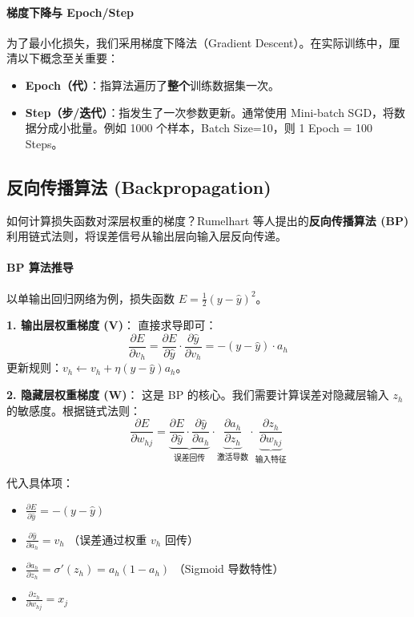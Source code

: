 \paragraph{梯度下降与 Epoch/Step}
为了最小化损失，我们采用梯度下降法（Gradient Descent）。在实际训练中，厘清以下概念至关重要：
\begin{itemize}
    \item \textbf{Epoch（代）}：指算法遍历了\textbf{整个}训练数据集一次。
    \item \textbf{Step（步/迭代）}：指发生了一次参数更新。通常使用 Mini-batch SGD，将数据分成小批量。例如 1000 个样本，Batch Size=10，则 1 Epoch = 100 Steps。
\end{itemize}

\subsection{反向传播算法 (Backpropagation)}
\label{subsec:backprop}

如何计算损失函数对深层权重的梯度？Rumelhart 等人提出的\textbf{反向传播算法 (BP)} 利用链式法则，将误差信号从输出层向输入层反向传递。

\paragraph{BP 算法推导}
以单输出回归网络为例，损失函数 $E = \frac{1}{2}(y - \hat{y})^2$。

\textbf{1. 输出层权重梯度 ($\mathbf{V}$)}：
直接求导即可：
\begin{equation}
    \frac{\partial E}{\partial v_h} = \frac{\partial E}{\partial \hat{y}} \cdot \frac{\partial \hat{y}}{\partial v_h} = -(y - \hat{y}) \cdot a_h
\end{equation}
更新规则：$v_h \leftarrow v_h + \eta (y - \hat{y}) a_h$。

\textbf{2. 隐藏层权重梯度 ($\mathbf{W}$)}：
这是 BP 的核心。我们需要计算误差对隐藏层输入 $z_h$ 的敏感度。根据链式法则：
\begin{equation}
    \frac{\partial E}{\partial w_{hj}} = \underbrace{\frac{\partial E}{\partial \hat{y}} \cdot \frac{\partial \hat{y}}{\partial a_h}}_{\text{误差回传}} \cdot \underbrace{\frac{\partial a_h}{\partial z_h}}_{\text{激活导数}} \cdot \underbrace{\frac{\partial z_h}{\partial w_{hj}}}_{\text{输入特征}}
\end{equation}

代入具体项：
\begin{itemize}
    \item $\frac{\partial E}{\partial \hat{y}} = -(y - \hat{y})$
    \item $\frac{\partial \hat{y}}{\partial a_h} = v_h$ （误差通过权重 $v_h$ 回传）
    \item $\frac{\partial a_h}{\partial z_h} = \sigma'(z_h) = a_h(1-a_h)$ （Sigmoid 导数特性）
    \item $\frac{\partial z_h}{\partial w_{hj}} = x_j$
\end{itemize}

